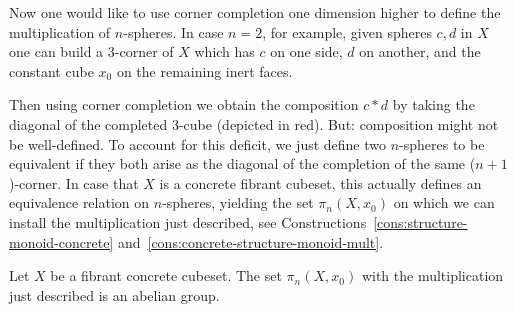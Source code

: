 Now one would like to use corner completion one dimension higher to define the multiplication of $n$-spheres.
In case $n = 2$, for example, given spheres $c,d$ in $X$
one can build a 3-corner of $X$ which has $c$ on one side, $d$ on another,
and the constant cube $x_0$ on the remaining inert faces.
\begin{center}
\end{center}
Then using corner completion we obtain the composition $c*d$
by taking the diagonal of the completed 3-cube (depicted in red).
But: composition might not be well-defined.
To account for this deficit, we just define two $n$-spheres to be equivalent if
they both arise as the diagonal of the completion of the same ($n+1$)-corner.
In case that $X$ is a concrete fibrant cubeset, this actually defines an equivalence relation on $n$-spheres,
yielding the set $\pi_n(X,x_0)$ on which we can install the multiplication just described,
see Constructions~\ref{cons:structure-monoid-concrete} and~\ref{cons:concrete-structure-monoid-mult}.

\begin{proposition*}
Let $X$ be a fibrant concrete cubeset.
The set $\pi_n(X,x_0)$ with the multiplication just described is an abelian group.
\end{proposition*}

